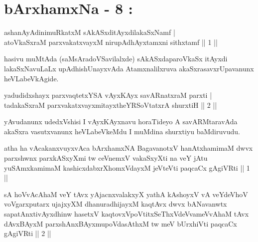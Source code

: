 
\chapter{bArxhamxNa - 8 :}


\begin{shl}
ashanAyAdinimuRkatxM sAkASxditAyxdilakaSxNamf |\\
atoV\s kaSxraM parxvakatxvayxM nirupAdhAyxtamxni sithxtamf \hfill || 1 ||
\end{shl}

\begin{artha}
hasivu muMtAda (saMsAradoVSavilalxde) sAkASxdaparoVkaSx itAyxdi lakaSxNavuLaLx upAdhishUnayxvAda Atamxnalilxruva akaSxrasavxrUpavanunx heVLabeVkAgide.
\end{artha}

\begin{shl}
yadudidxshayx parxvaqtetxYSA vAyxKAyx savARnatxraM parxti |\\
tadakaSxraM parxvakatxvayxmitayxtheYRSoVtatxrA shurxtiH \hfill || 2 ||
\end{shl}

\begin{artha}
yAvudanunx udedxVshisi I vAyxKAyxnavu horaTideyo A savARMtaravAda akaSxra vasutxvanunx heVLabeVkeMdu I muMdina shurxtiyu baMdiruvudu.
\end{artha}



\begin{kandikeshl}
atha ha vAcakanxvuyxvAca bArxhamxNA BagavanotxV hanAtxhamimaM dwvx parxshwnx parxkASxyXmi tw ceVnemxV vakaSxyXti na veY jAtu yuSAmxkamimaM kashicxdabxrXhomxVdayxM jeVteVti paqcaCx gAgiVRti || 1 ||
\end{kandikeshl}

\begin{kandikeshl}
sA hoVvAcAhaM veY tAvx yAjacnxvalakxyX yathA kAshoyxV vA veYdeVhoV voVgarxputarx ujajxyXM dhanuradhijayxM kaqtAvx dwvx bANavanwtx sapatAnxtivAyxdhinw hasetxV kaqtovxVpoVtitxSeThxVdeVvameVvAhaM tAvx dAvxBAyxM parxshAnxBAyxmupoVdasAthxM tw meV bUrxhiVti paqcaCx gAgiVRti || 2 ||
\end{kandikeshl}

